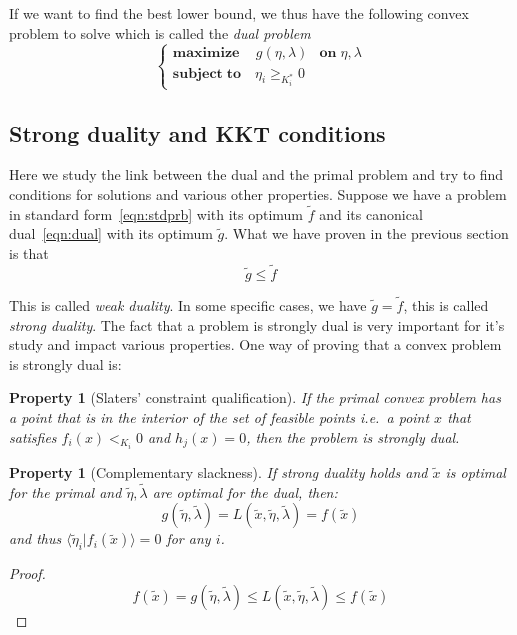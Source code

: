 \documentclass[10pt,a4paper]{report}
\theoremstyle{plain}
\newtheorem{prop}[thm]{Property}
\theoremstyle{definition}
\theoremstyle{remark}
\newcommand{\braket}[2]{\langle#1|#2\rangle}
\renewcommand{\geq}{\geqslant}
\renewcommand{\leq}{\leqslant}
\newcommand{\maxim}[3]{\begin{cases}
    \mathbf{maximize}\,\quad #1& \mathbf{on}\; #2\\
    \mathbf{subject\;to}\quad #3
  \end{cases}}
\begin{document}
If we want to find the best lower bound, we thus have the following convex
problem to solve which is called the \emph{dual problem}
\begin{equation}\label{eqn:dual}
\maxim{g(\eta,\lambda)}{\eta,\lambda}{\eta_i \geq_{K_i^*} 0}
\end{equation}

\subsection{Strong duality and KKT conditions}

Here we study the link between the dual and the primal problem and try to find
conditions for solutions and various other properties. Suppose we have a problem in
standard form~\ref{eqn:stdprb} with its optimum $\tilde f$ and its canonical
dual~\ref{eqn:dual} with its optimum $\tilde g$. What we have proven in the
previous section is that
\[\tilde g \leq \tilde f\]

This is called \emph{weak duality}. In some specific cases, we have $\tilde g =
\tilde f$, this is called \emph{strong duality}. The fact that a problem is
strongly dual is very important for it's study and impact various properties.
One way of proving that a convex problem is strongly dual is:
\begin{prop}[Slaters' constraint qualification]\label{prop:slater}
  If the primal convex problem has a point that is in
  the interior of the set of feasible points i.e.\ a point $x$ that satisfies
  $f_i(x) <_{K_i} 0$ and $h_j(x) = 0$, then the problem is strongly dual.
\end{prop}

\begin{prop}[Complementary slackness]
  If strong duality holds and $\tilde x$ is optimal for the primal and
  $\tilde \eta, \tilde{\lambda}$ are optimal for the dual, then:
  \[g(\tilde \eta, \tilde{\lambda}) = L(\tilde x, \tilde{\eta},\tilde{\lambda}) = f(\tilde{x})\]
  and thus $\braket {\tilde\eta_i}{f_i(\tilde{x})} = 0$ for any $i$.
\end{prop}

\begin{proof}
  \[ f(\tilde x) = g(\tilde \eta, \tilde{\lambda}) \leq
    L(\tilde x, \tilde{\eta},\tilde{\lambda}) \leq f(\tilde{x})\]
\end{proof}
\end{document}
